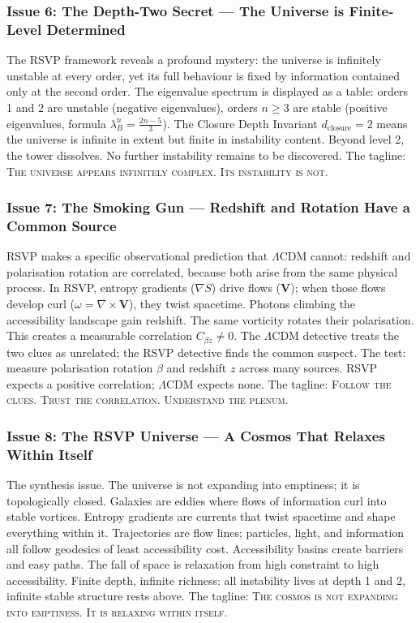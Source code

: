 \documentclass[12pt, a4paper]{article}
\begin{document}
\subsubsection{Issue 6: The Depth-Two Secret --- The Universe is Finite-Level Determined}

The RSVP framework reveals a profound mystery: the universe is infinitely unstable at every order, yet its full behaviour is fixed by information contained only at the second order. The eigenvalue spectrum is displayed as a table: orders 1 and 2 are unstable (negative eigenvalues), orders $n \geq 3$ are stable (positive eigenvalues, formula $\lambda_B^n = \tfrac{2n-5}{3}$). The Closure Depth Invariant $d_{\text{closure}} = 2$ means the universe is infinite in extent but finite in instability content. Beyond level 2, the tower dissolves. No further instability remains to be discovered. The tagline: \textsc{The universe appears infinitely complex. Its instability is not.}

\subsubsection{Issue 7: The Smoking Gun --- Redshift and Rotation Have a Common Source}

RSVP makes a specific observational prediction that $\Lambda$CDM cannot: redshift and polarisation rotation are correlated, because both arise from the same physical process. In RSVP, entropy gradients ($\nabla S$) drive flows ($\mathbf{V}$); when those flows develop curl ($\omega = \nabla \times \mathbf{V}$), they twist spacetime. Photons climbing the accessibility landscape gain redshift. The same vorticity rotates their polarisation. This creates a measurable correlation $C_{\beta z} \neq 0$. The $\Lambda$CDM detective treats the two clues as unrelated; the RSVP detective finds the common suspect. The test: measure polarisation rotation $\beta$ and redshift $z$ across many sources. RSVP expects a positive correlation; $\Lambda$CDM expects none. The tagline: \textsc{Follow the clues. Trust the correlation. Understand the plenum.}

\subsubsection{Issue 8: The RSVP Universe --- A Cosmos That Relaxes Within Itself}

The synthesis issue. The universe is not expanding into emptiness; it is topologically closed. Galaxies are eddies where flows of information curl into stable vortices. Entropy gradients are currents that twist spacetime and shape everything within it. Trajectories are flow lines; particles, light, and information all follow geodesics of least accessibility cost. Accessibility basins create barriers and easy paths. The fall of space is relaxation from high constraint to high accessibility. Finite depth, infinite richness: all instability lives at depth 1 and 2, infinite stable structure rests above. The tagline: \textsc{The cosmos is not expanding into emptiness. It is relaxing within itself.}
\end{document}
